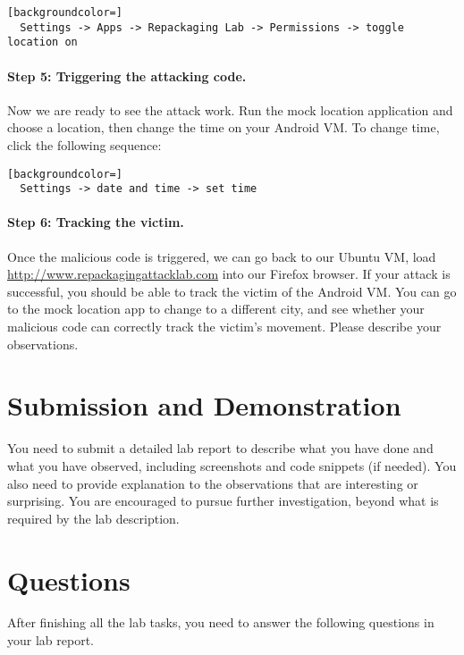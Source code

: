 \begin{lstlisting}[backgroundcolor=]
  Settings -> Apps -> Repackaging Lab -> Permissions -> toggle location on
\end{lstlisting}


\paragraph{Step 5: Triggering the attacking code.}
Now we are ready to see the attack work. Run the mock location application
and choose a location, then change the time on your Android VM. To change
time, click the following sequence:

\begin{lstlisting}[backgroundcolor=]
  Settings -> date and time -> set time 
\end{lstlisting}


\paragraph{Step 6: Tracking the victim.}
Once the malicious code is triggered, we can go back to our Ubuntu VM, 
load \url{http://www.repackagingattacklab.com} into our Firefox browser.   
If your attack is successful,  you should be able to track the victim of
the Android VM. You can go to the mock location app to change to a
different city, and see whether your malicious code can correctly 
track the victim's movement. Please describe your observations. 


\section{Submission and Demonstration}

You need to submit a detailed lab report to describe what you have done and what you have
observed, including screenshots and code snippets (if needed). You also need to provide
explanation to the observations that are interesting or surprising. You are encouraged to
pursue further investigation, beyond what is required by the lab description.




\section{Questions}

After finishing all the lab tasks, you need to answer the following questions 
in your lab report.


